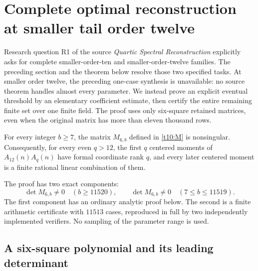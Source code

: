 \section{Complete optimal reconstruction at smaller tail order twelve}
\label{t12:section}

Research question R1 of the source \emph{Quartic Spectral Reconstruction}
explicitly asks for complete smaller-order-ten and smaller-order-twelve
families. The preceding section and the theorem below resolve those two
specified tasks. At smaller order twelve, the preceding one-case synthesis
is unavailable:
no source theorem handles almost every parameter. We instead prove an
explicit eventual threshold by an elementary coefficient estimate, then
certify the entire remaining finite set over one finite field. The proof
uses only six-square retained matrices, even when the original matrix has
more than eleven thousand rows.

\begin{theorem}
\label{t12:complete}
For every integer $b\ge7$, the matrix $M_{6,b}$ defined in
\eqref{t10:M} is nonsingular. Consequently, for every even $q>12$,
the first $q$ centered moments of $A_{12}(n)A_q(n)$ have formal
coordinate rank $q$, and every later centered moment is a finite
rational linear combination of them.
\end{theorem}

The proof has two exact components:
\[
 \det M_{6,b}\ne0\quad(b\ge11520),\qquad
 \det M_{6,b}\ne0\quad(7\le b\le11519).
\]
The first component has an ordinary analytic proof below. The second is
a finite arithmetic certificate with $11513$ cases, reproduced in full
by two independently implemented verifiers. No sampling of the parameter
range is used.

\subsection{A six-square polynomial and its leading determinant}

